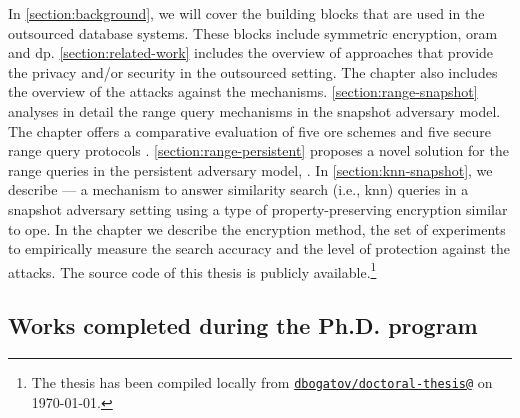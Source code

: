 		In \cref{section:background}, we will cover the building blocks that are used in the outsourced database systems.
		These blocks include symmetric encryption, \acrshort{oram} and \acrlong{dp}.
		\cref{section:related-work} includes the overview of approaches that provide the privacy and/or security in the outsourced setting.
		The chapter also includes the overview of the attacks against the mechanisms.
		\cref{section:range-snapshot} analyses in detail the range query mechanisms in the snapshot adversary model.
		The chapter offers a comparative evaluation of five \acrlong{ore} schemes and five secure range query protocols \cite{ore-benchmark-17}.
		\cref{section:range-persistent} proposes a novel solution for the range queries in the persistent adversary model, \epsolute{} \cite{ore-benchmark-17}.
		In \cref{section:knn-snapshot}, we describe \kanon{} \cite{k-anon} --- a mechanism to answer similarity search (i.e., \acrlong{knn}) queries in a snapshot adversary setting using a type of property-preserving encryption similar to \acrshort{ope}.
		In the chapter we describe the encryption method, the set of experiments to empirically measure the search accuracy and the level of protection against the attacks.
		The source code of this thesis is publicly available.\footnote{
			The thesis has been compiled
			\ifthenelse%
				{}
				{locally}
				{from \href{https://github.com/dbogatov/doctoral-thesis/commit/\version}{\texttt{dbogatov/doctoral-thesis@\version}}}
			on \today{}.
		}

		\subsection{Works completed during the Ph.D. program}

			\newlength{\citationLength}
			\setlength{\citationLength}{\dimexpr\citationLength+0.9em\relax}
			\begin{description}[
				leftmargin=\dimexpr\citationLength+0.7em\relax,
				labelindent=0pt,
				labelwidth=\citationLength%
			]
				\item[\cite{ore-benchmark-17}] 
				\item[\cite{epsolute}] 
				\item[\cite{k-anon}] 
				\item[\cite{bogatov-idemix-2020}] 
				\item[\cite{dispot}] 
			\end{description}

